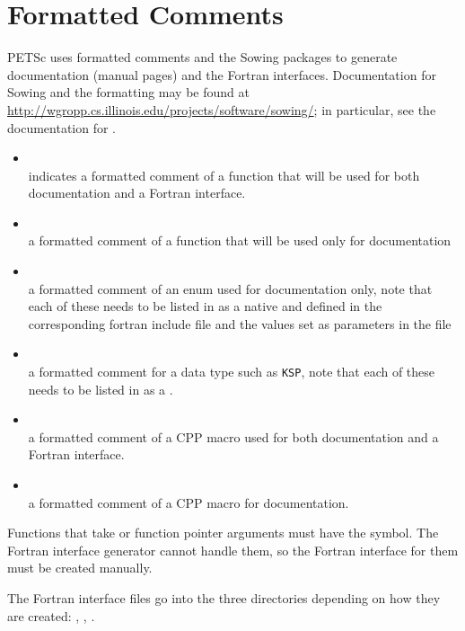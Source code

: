 \section{Formatted Comments}

PETSc uses formatted comments and the Sowing packages to generate documentation (manual pages) and the Fortran interfaces. 
Documentation for Sowing and the formatting may be found at \href{http://wgropp.cs.illinois.edu/projects/software/sowing/}{http://wgropp.cs.illinois.edu/projects/software/sowing/}; in particular, see the documentation for .

\begin{itemize}
    \item
      \\      indicates a formatted comment of a function that will be used for
        both documentation and a Fortran interface.
    \item
      \\    a formatted comment of a function that will be used only for
        documentation
    \item
      \\     a formatted comment of an enum used for documentation only, note that
        each of these needs to be listed in  as
        a native and defined in the corresponding
         fortran include file and the values
        set as parameters in the file 
    \item
      \\     a formatted comment for a data type such as \lstinline{KSP}, note that each of these
        needs to be listed in  as a .
    \item
      \\     a formatted comment of a CPP macro used for both documentation and
        a Fortran interface.
    \item
      \\    a formatted comment of a CPP macro for documentation.
\end{itemize}

Functions that take  or function pointer arguments must have the  symbol. 
The Fortran interface generator cannot handle them, so the Fortran interface for them must be created manually.

The Fortran interface files go into the three directories depending on how they are created: , , .

